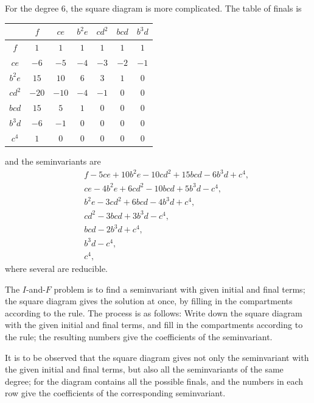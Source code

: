 \documentclass[11pt,a4paper]{book}
\begin{document}
\setcounter{art}{42}
\begin{art}
For the degree 6, the square diagram is more complicated. The table of finals is
\begin{center}
\begin{tabular}{c|cccccc}
 & $f$ & $ce$ & $b^{2}e$ & $cd^{2}$ & $bcd$ & $b^{3}d$ \\
\hline
$f$ & $1$ & $1$ & $1$ & $1$ & $1$ & $1$ \\
$ce$ & $-6$ & $-5$ & $-4$ & $-3$ & $-2$ & $-1$ \\
$b^{2}e$ & $15$ & $10$ & $6$ & $3$ & $1$ & $0$ \\
$cd^{2}$ & $-20$ & $-10$ & $-4$ & $-1$ & $0$ & $0$ \\
$bcd$ & $15$ & $5$ & $1$ & $0$ & $0$ & $0$ \\
$b^{3}d$ & $-6$ & $-1$ & $0$ & $0$ & $0$ & $0$ \\
$c^{4}$ & $1$ & $0$ & $0$ & $0$ & $0$ & $0$ \\
\end{tabular}
\end{center}
and the seminvariants are
\begin{align*}
&\phantom{+}f - 5ce + 10b^{2}e - 10cd^{2} + 15bcd - 6b^{3}d + c^{4},\\
&\phantom{+}ce - 4b^{2}e + 6cd^{2} - 10bcd + 5b^{3}d - c^{4},\\
&\phantom{+}b^{2}e - 3cd^{2} + 6bcd - 4b^{3}d + c^{4},\\
&\phantom{+}cd^{2} - 3bcd + 3b^{3}d - c^{4},\\
&\phantom{+}bcd - 2b^{3}d + c^{4},\\
&\phantom{+}b^{3}d - c^{4},\\
&\phantom{+}c^{4},
\end{align*}
where several are reducible.
\end{art}

\setcounter{art}{43}
\begin{art}
The $I$-and-$F$ problem is to find a seminvariant with given initial and final terms; the square diagram gives the solution at once, by filling in the compartments according to the rule. The process is as follows: Write down the square diagram with the given initial and final terms, and fill in the compartments according to the rule; the resulting numbers give the coefficients of the seminvariant.
\end{art}

\setcounter{art}{44}
\begin{art}
It is to be observed that the square diagram gives not only the seminvariant with the given initial and final terms, but also all the seminvariants of the same degree; for the diagram contains all the possible finals, and the numbers in each row give the coefficients of the corresponding seminvariant.
\end{art}
\end{document}
